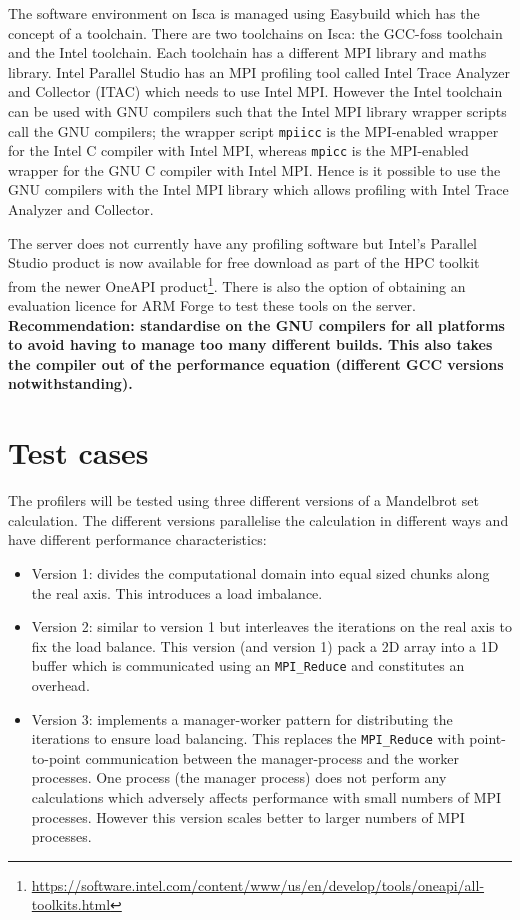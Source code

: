 \documentclass[a4paper,titlepage]{article}
\begin{document}
The software environment on Isca is managed using Easybuild which has the concept of a toolchain. There are two toolchains on Isca: the GCC-foss toolchain and the Intel toolchain. Each toolchain has a different MPI library and maths library. Intel Parallel Studio has an MPI profiling tool called Intel Trace Analyzer and Collector (ITAC) which needs to use Intel MPI. However the Intel toolchain can be used with GNU compilers such that the Intel MPI library wrapper scripts call the GNU compilers; the wrapper script \texttt{mpiicc} is the MPI-enabled wrapper for the Intel C compiler with Intel MPI, whereas \texttt{mpicc} is the MPI-enabled wrapper for the GNU C compiler with Intel MPI. Hence is it possible to use the GNU compilers with the Intel MPI library which allows profiling with Intel Trace Analyzer and Collector. 

The server does not currently have any profiling software but Intel's Parallel Studio product is now available for free download as part of the HPC toolkit from the newer OneAPI product\footnote{\url{https://software.intel.com/content/www/us/en/develop/tools/oneapi/all-toolkits.html}}. There is also the option of obtaining an evaluation licence for ARM Forge to test these tools on the server. \\

\noindent
\textbf{Recommendation: standardise on the GNU compilers for all platforms to avoid having to manage too many different builds. This also takes the compiler out of the performance equation (different GCC versions notwithstanding).}


\section{Test cases}

The profilers will be tested using three different versions of a Mandelbrot set calculation. The different versions parallelise the calculation in different ways and have different performance characteristics:
\begin{itemize}
\item Version 1: divides the computational domain into equal sized chunks along the real axis. This introduces a load imbalance.
\item Version 2: similar to version 1 but interleaves the iterations on the real axis to fix the load balance. This version (and version 1) pack a 2D array into a 1D buffer which is communicated using an \verb+MPI_Reduce+ and constitutes an overhead.
\item Version 3: implements a manager-worker pattern for distributing the iterations to ensure load balancing. This replaces the \verb+MPI_Reduce+ with point-to-point communication between the manager-process and the worker processes. One process (the manager process) does not perform any calculations which adversely affects performance with small numbers of MPI processes. However this version scales better to larger numbers of MPI processes.
\end{itemize}
\end{document}
